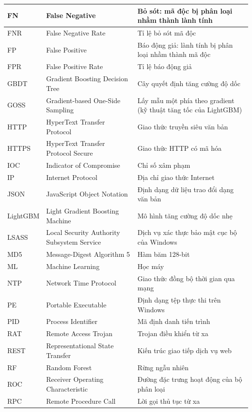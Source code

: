 \documentclass[../DoAn.tex]{subfiles}
\begin{document}
\begin{longtable}{|l|p{5.2cm}|p{6cm}|}
\hline
FN & False Negative & Bỏ sót: mã độc bị phân loại nhầm thành lành tính \\
\hline
FNR & False Negative Rate & Tỉ lệ bỏ sót mã độc \\
\hline
FP & False Positive & Báo động giả: lành tính bị phân loại nhầm thành mã độc \\
\hline
FPR & False Positive Rate & Tỉ lệ báo động giả \\
\hline
GBDT & Gradient Boosting Decision Tree & Cây quyết định tăng cường độ dốc \\
\hline
GOSS & Gradient-based One-Side Sampling & Lấy mẫu một phía theo gradient (kỹ thuật tăng tốc của LightGBM) \\
\hline
HTTP & HyperText Transfer Protocol & Giao thức truyền siêu văn bản \\
\hline
HTTPS & HyperText Transfer Protocol Secure & Giao thức HTTP có mã hóa \\
\hline
IOC & Indicator of Compromise & Chỉ số xâm phạm \\
\hline
IP & Internet Protocol & Địa chỉ giao thức Internet \\
\hline
JSON & JavaScript Object Notation & Định dạng dữ liệu trao đổi dạng văn bản \\
\hline
LightGBM & Light Gradient Boosting Machine & Mô hình tăng cường độ dốc nhẹ \\
\hline
LSASS & Local Security Authority Subsystem Service & Dịch vụ xác thực bảo mật cục bộ của Windows \\
\hline
MD5 & Message-Digest Algorithm 5 & Hàm băm 128-bit \\
\hline
ML & Machine Learning & Học máy \\
\hline
NTP & Network Time Protocol & Giao thức đồng bộ thời gian qua mạng \\
\hline
PE & Portable Executable & Định dạng tệp thực thi trên Windows \\
\hline
PID & Process Identifier & Mã định danh tiến trình \\
\hline
RAT & Remote Access Trojan & Trojan điều khiển từ xa \\
\hline
REST & Representational State Transfer & Kiến trúc giao tiếp dịch vụ web \\
\hline
RF & Random Forest & Rừng ngẫu nhiên \\
\hline
ROC & Receiver Operating Characteristic & Đường đặc trưng hoạt động của bộ phân loại \\
\hline
RPC & Remote Procedure Call & Lời gọi thủ tục từ xa \\

\end{longtable}
\end{document}
